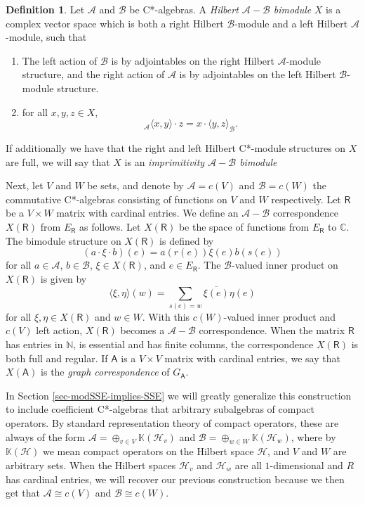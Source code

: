 \documentclass[11pt, letterpaper,final]{amsart}
\newcommand{\A}{{\mathcal{A}}}
\newcommand{\B}{{\mathcal{B}}}
\renewcommand{\H}{{\mathcal{H}}}
\newcommand{\bbC}{{\mathbb{C}}}
\newcommand{\bbK}{{\mathbb{K}}}
\theoremstyle{definition}
\newtheorem{dfn}[thm]{Definition}
\begin{document}
\begin{dfn}
Let $\A$ and $\B$ be C*-algebras.  A \emph{Hilbert $\A-\B$ bimodule} $X$ is a complex vector space which is both a right Hilbert $\B$-module and a left Hilbert $\A$-module, such that 
\begin{enumerate}
\item The left action of $\B$ is by adjointables on the right Hilbert $\A$-module structure, and the right action of $\A$ is by adjointables on the left Hilbert $\B$-module structure.

\item for all $x, y, z \in X$, 
$$
_\A \langle x, y \rangle \cdot z = x \cdot \langle y, z \rangle_\B.
$$
\end{enumerate}
If additionally we have that the right and left Hilbert C*-module structures on $X$ are full, we will say that $X$ is an \emph{imprimitivity $\A-\B$ bimodule}
\end{dfn}


Next, let $V$ and $W$ be sets, and denote by $\A = c(V)$ and $\B = c(W)$ the commutative C*-algebras consisting of functions on $V$ and $W$ respectively. Let $\mathsf{R}$ be a $V\times W$ matrix with cardinal entries. We define an $\A-\B$ correspondence $X(\mathsf{R})$ from $E_\mathsf{R}$ as follows.
Let $X(\mathsf{R})$ be the space of functions from $E_\mathsf{R}$ to $\bbC$.
The bimodule structure on $X(\mathsf{R})$ is defined by
\[
  (a\cdot \xi \cdot b)(e) = a(r(e))\xi(e) b(s(e))
\]
for all $a\in \A$, $b\in \B$, $\xi \in X(\mathsf{R})$, and $e\in E_\mathsf{R}$.
The $\B$-valued inner product on $X(\mathsf{R})$ is given by
\[
  \langle \xi, \eta\rangle(w) = \sum_{s(e)=w}\overline{\xi(e)}\eta(e)
\]
for all $\xi,\eta\in X(\mathsf{R})$ and $w\in W$. With this $c(W)$-valued inner product and $c(V)$ left action, $X(\mathsf{R})$ becomes a $\A-\B$ correspondence.
When the matrix $\mathsf{R}$ has entries in $\mathbb{N}$, is essential and has finite columns, the correspondence $X(\mathsf{R})$ is both full and regular. If $\mathsf{A}$ is a $V\times V$ matrix with cardinal entries, we say that $X(\mathsf{A})$ is the \emph{graph correspondence} of $G_{\mathsf{A}}$.

In Section \ref{sec-modSSE-implies-SSE} we will greatly generalize this construction to include coefficient C*-algebras that arbitrary subalgebras of compact operators. By standard representation theory of compact operators, these are always of the form $\A = \oplus_{v \in V} \bbK(\H_v)$ and $\B = \oplus_{w\in W} \bbK(\H_w)$, where by $\mathbb{K}(\H)$ we mean compact operators on the Hilbert space $\H$, and $V$ and $W$ are arbitrary sets. When the Hilbert spaces $\H_v$ and $\H_w$ are all $1$-dimensional and $R$ has cardinal entries, we will recover our previous construction because we then get that $\A \cong c(V)$ and $\B \cong c(W)$. 
\end{document}
